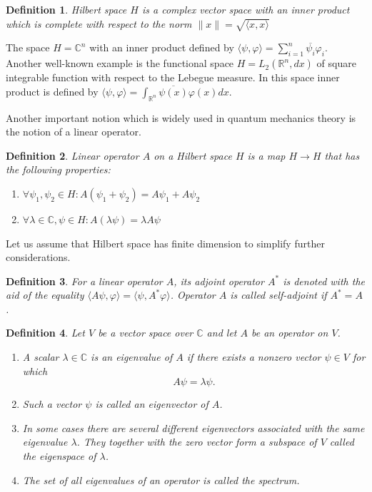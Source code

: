 \documentclass[11pt]{article}
\newtheorem{definition}{Definition}[section]
\begin{document}
\begin{definition}
Hilbert space $H$ is a complex vector space with an inner product which is complete with respect to the norm $\|x\| = \sqrt{\langle x, x\rangle}$
\end{definition}

The space $H = \mathbb{C}^n$ with an inner product defined by $\langle\psi, \varphi \rangle = \sum_{i = 1}^n \overline{\psi_i}\varphi_i$. Another well-known example is the functional space $H = L_2(\mathbb{R}^n, dx)$ of square integrable function with respect to the Lebegue measure. In this space inner product is defined by $\langle\psi, \varphi \rangle = \int_{\mathbb{R}^n}\overline{\psi(x)}\varphi(x) dx$.

Another important notion which is widely used in quantum mechanics theory is the notion of a linear operator.
\begin{definition}
Linear operator $A$ on a Hilbert space $H$ is a map $H \to H$ that has the following properties:
\begin{enumerate}
\item $\forall \psi_1,\psi_2\in H: A(\psi_1 + \psi_2) = A\psi_1 + A\psi_2 $
\item $\forall\lambda\in\mathbb{C}, \psi\in H: A(\lambda\psi) = \lambda A\psi$
\end{enumerate}
\end{definition}

Let us assume that Hilbert space has finite dimension to simplify further considerations.

\begin{definition}
For a linear operator $A$, its adjoint operator $A^*$ is denoted with the aid of the equality $\langle A\psi,\varphi\rangle = \langle\psi, A^*\varphi\rangle$. Operator $A$ is called self-adjoint if $A^* = A$.
\end{definition}

\begin{definition}
Let $V$ be a vector space over $\mathbb{C}$ and let $A$ be an operator on $V$.
\begin{enumerate}
\item A scalar $\lambda\in \mathbb{C}$ is an eigenvalue of $A$ if there exists a nonzero vector $\psi\in V$ for which
\[
A\psi = \lambda\psi.
\]
\item Such a vector $\psi$ is called an eigenvector of $A$.
\item In some cases there are several different eigenvectors associated with the same eigenvalue $\lambda$. They together with the zero vector form a subspace of $V$ called the eigenspace of $\lambda$.
\item The set of all eigenvalues of an operator is called the spectrum.
\end{enumerate}
\end{definition}
\end{document}
